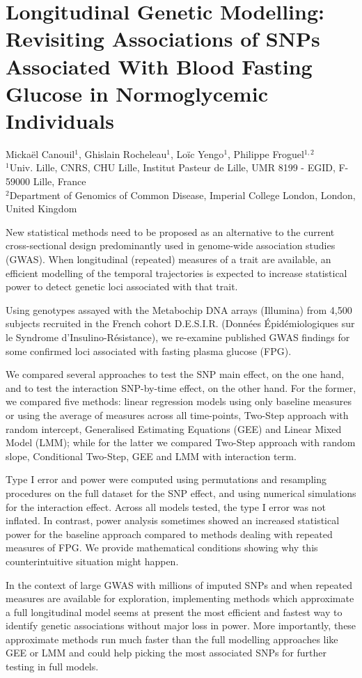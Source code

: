 \documentclass[11pt, a4paper]{article}
\begin{document}
\section*{Longitudinal Genetic Modelling: Revisiting Associations of SNPs Associated With Blood Fasting Glucose in Normoglycemic Individuals}
\par{\small{{
    Mickaël Canouil$^{1}$, Ghislain Rocheleau$^{1}$, Loïc Yengo$^{1}$, Philippe Froguel$^{1,2}$\\
    $^{1}$Univ. Lille, CNRS, CHU Lille, Institut Pasteur de Lille, UMR 8199 - EGID, F-59000 Lille, France\\
    $^{2}$Department of Genomics of Common Disease, Imperial College London, London, United Kingdom\\
}}}
\par{New statistical methods need to be proposed as an alternative to the current cross-sectional design predominantly used in genome-wide association studies (GWAS). When longitudinal (repeated) measures of a trait are available, an efficient modelling of the temporal trajectories is expected to increase statistical power to detect genetic loci associated with that trait.}
\\
\par{Using genotypes assayed with the Metabochip DNA arrays (Illumina) from 4,500 subjects recruited in the French cohort D.E.S.I.R. (Données Épidémiologiques sur le Syndrome d’Insulino-Résistance), we re-examine published GWAS findings for some confirmed loci associated with fasting plasma glucose (FPG).}
\\
\par{We compared several approaches to test the SNP main effect, on the one hand, and to test the interaction SNP-by-time effect, on the other hand. For the former, we compared five methods: linear regression models using only baseline measures or using the average of measures across all time-points, Two-Step approach with random intercept, Generalised Estimating Equations (GEE) and Linear Mixed Model (LMM); while for the latter we compared Two-Step approach with random slope, Conditional Two-Step, GEE and LMM with interaction term.}
\\
\par{Type I error and power were computed using permutations and resampling procedures on the full dataset for the SNP effect, and using numerical simulations for the interaction effect. Across all models tested, the type I error was not inflated. In contrast, power analysis sometimes showed an increased statistical power for the baseline approach compared to methods dealing with repeated measures of FPG. We provide mathematical conditions showing why this counterintuitive situation might happen.}
\\
\par{In the context of large GWAS with millions of imputed SNPs and when repeated measures are available for exploration, implementing methods which approximate a full longitudinal model seems at present the most efficient and fastest way to identify genetic associations without major loss in power. More importantly, these approximate methods run much faster than the full modelling approaches like GEE or LMM and could help picking the most associated SNPs for further testing in full models.}
\end{document}
